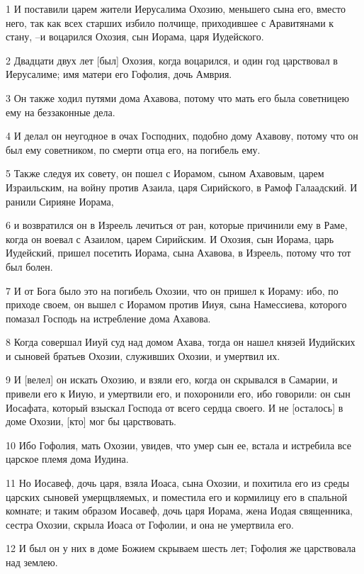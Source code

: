 \par 1 И поставили царем жители Иерусалима Охозию, меньшего сына его, вместо него, так как всех старших избило полчище, приходившее с Аравитянами к стану, --и воцарился Охозия, сын Иорама, царя Иудейского.
\par 2 Двадцати двух лет [был] Охозия, когда воцарился, и один год царствовал в Иерусалиме; имя матери его Гофолия, дочь Амврия.
\par 3 Он также ходил путями дома Ахавова, потому что мать его была советницею ему на беззаконные дела.
\par 4 И делал он неугодное в очах Господних, подобно дому Ахавову, потому что он был ему советником, по смерти отца его, на погибель ему.
\par 5 Также следуя их совету, он пошел с Иорамом, сыном Ахавовым, царем Израильским, на войну против Азаила, царя Сирийского, в Рамоф Галаадский. И ранили Сирияне Иорама,
\par 6 и возвратился он в Изреель лечиться от ран, которые причинили ему в Раме, когда он воевал с Азаилом, царем Сирийским. И Охозия, сын Иорама, царь Иудейский, пришел посетить Иорама, сына Ахавова, в Изреель, потому что тот был болен.
\par 7 И от Бога было это на погибель Охозии, что он пришел к Иораму: ибо, по приходе своем, он вышел с Иорамом против Ииуя, сына Намессиева, которого помазал Господь на истребление дома Ахавова.
\par 8 Когда совершал Ииуй суд над домом Ахава, тогда он нашел князей Иудийских и сыновей братьев Охозии, служивших Охозии, и умертвил их.
\par 9 И [велел] он искать Охозию, и взяли его, когда он скрывался в Самарии, и привели его к Ииую, и умертвили его, и похоронили его, ибо говорили: он сын Иосафата, который взыскал Господа от всего сердца своего. И не [осталось] в доме Охозии, [кто] мог бы царствовать.
\par 10 Ибо Гофолия, мать Охозии, увидев, что умер сын ее, встала и истребила все царское племя дома Иудина.
\par 11 Но Иосавеф, дочь царя, взяла Иоаса, сына Охозии, и похитила его из среды царских сыновей умерщвляемых, и поместила его и кормилицу его в спальной комнате; и таким образом Иосавеф, дочь царя Иорама, жена Иодая священника, сестра Охозии, скрыла Иоаса от Гофолии, и она не умертвила его.
\par 12 И был он у них в доме Божием скрываем шесть лет; Гофолия же царствовала над землею.

